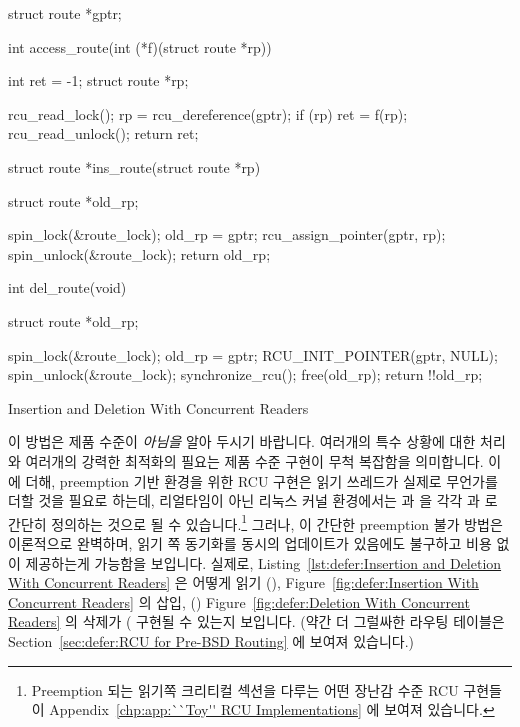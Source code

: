 \begin{listing}[tbp]
\begin{fcvlabel}
\begin{VerbatimL}[commandchars=\\\[\]]
struct route *gptr;

int access_route(int (*f)(struct route *rp))
{
	int ret = -1;
	struct route *rp;

	rcu_read_lock();
	rp = rcu_dereference(gptr);
	if (rp)
		ret = f(rp);		\lnlbl[access_rp]
	rcu_read_unlock();
	return ret;
}

struct route *ins_route(struct route *rp)
{
	struct route *old_rp;

	spin_lock(&route_lock);
	old_rp = gptr;
	rcu_assign_pointer(gptr, rp);
	spin_unlock(&route_lock);
	return old_rp;
}

int del_route(void)
{
	struct route *old_rp;

	spin_lock(&route_lock);
	old_rp = gptr;
	RCU_INIT_POINTER(gptr, NULL);
	spin_unlock(&route_lock);
	synchronize_rcu();
	free(old_rp);
	return !!old_rp;
}
\end{VerbatimL}
\end{fcvlabel}
\caption{Insertion and Deletion With Concurrent Readers}
\label{lst:defer:Insertion and Deletion With Concurrent Readers}
\end{listing}

이 방법은 제품 수준이 \emph{아님을} 알아 두시기 바랍니다.
여러개의 특수 상황에 대한 처리와 여러개의 강력한 최적화의 필요는 제품 수준
구현이 무척 복잡함을 의미합니다.
이에 더해, preemption 기반 환경을 위한 RCU 구현은 읽기 쓰레드가 실제로 무언가를
더할 것을 필요로 하는데, 리얼타임이 아닌 리눅스 커널 환경에서는
 과  을 각각 
과  로 간단히 정의하는 것으로 될 수 있습니다.\footnote{
	Preemption 되는 읽기쪽 크리티컬 섹션을 다루는 어떤 장난감 수준 RCU
	구현들이 Appendix~\ref{chp:app:``Toy'' RCU Implementations} 에 보여져
	있습니다.}
그러나, 이 간단한 preemption 불가 방법은 이론적으로 완벽하며, 읽기 쪽 동기화를
동시의 업데이트가 있음에도 불구하고 비용 없이 제공하는게 가능함을 보입니다.
실제로,
Listing~\ref{lst:defer:Insertion and Deletion With Concurrent Readers}
은 어떻게 읽기 (),
Figure~\ref{fig:defer:Insertion With Concurrent Readers} 의 삽입,
()
Figure~\ref{fig:defer:Deletion With Concurrent Readers} 의 삭제가
( 구현될 수 있는지 보입니다.
(약간 더 그럴싸한 라우팅 테이블은
Section~\ref{sec:defer:RCU for Pre-BSD Routing} 에 보여져 있습니다.)

